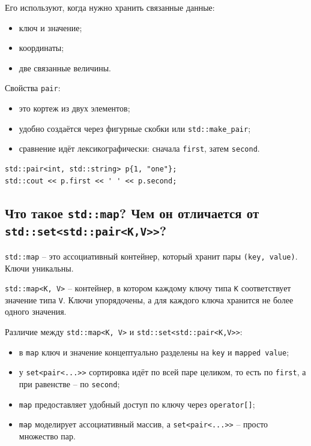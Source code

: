 Его используют, когда нужно хранить связанные данные:
\begin{itemize}
    \item ключ и значение;
    \item координаты;
    \item две связанные величины.
\end{itemize}

Свойства \texttt{pair}:
\begin{itemize}
    \item это кортеж из двух элементов;
    \item удобно создаётся через фигурные скобки или \texttt{std::make\_pair};
    \item сравнение идёт лексикографически: сначала \texttt{first}, затем \texttt{second}.
\end{itemize}

\begin{example}
\begin{verbatim}
std::pair<int, std::string> p{1, "one"};
std::cout << p.first << ' ' << p.second;
\end{verbatim}
\end{example}

\subsection{Что такое \texttt{std::map}? Чем он отличается от \texttt{std::set<std::pair<K,V>>}?}
\texttt{std::map} -- это ассоциативный контейнер, который хранит пары \texttt{(key, value)}. Ключи уникальны.

\begin{definition}
\texttt{std::map<K, V>} -- контейнер, в котором каждому ключу типа \texttt{K} соответствует значение типа \texttt{V}. Ключи упорядочены, а для каждого ключа хранится не более одного значения.
\end{definition}

Различие между \texttt{std::map<K, V>} и \texttt{std::set<std::pair<K,V>>}:
\begin{itemize}
    \item в \texttt{map} ключ и значение концептуально разделены на \texttt{key} и \texttt{mapped value};
    \item у \texttt{set<pair<...>>} сортировка идёт по всей паре целиком, то есть по \texttt{first}, а при равенстве -- по \texttt{second};
    \item \texttt{map} предоставляет удобный доступ по ключу через \texttt{operator[]};
    \item \texttt{map} моделирует ассоциативный массив, а \texttt{set<pair<...>>} -- просто множество пар.
\end{itemize}

